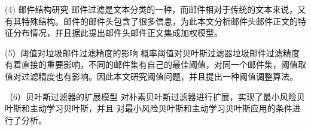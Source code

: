 (4) 邮件结构研究    邮件过滤是文本分类的一种，而邮件相对于传统的文本来说，又有其特殊结构。邮件的邮件头包含了很多信息，为此本文分析邮件头邮件正文的特征分布情况，并且据此提出邮件头邮件正文集成加权模型。 

(5）阈值对垃圾邮件过滤精度的影响   概率阈值对贝叶斯过滤器垃圾邮件过滤精度有着直接的重要影响，不同的邮件集有自己的最佳阈值，对同一个邮件集，阈值取值对过滤精度也有影响。因此本文研究阈值问题，并且提出一种阈值调整算法。  

（6）贝叶斯过滤器的扩展模型    对朴素贝叶斯过滤器进行扩展，实现了最小风险贝叶斯和主动学习贝叶斯，并且 对最小风险贝叶斯和主动学习贝叶斯应用的条件进行了分析。


